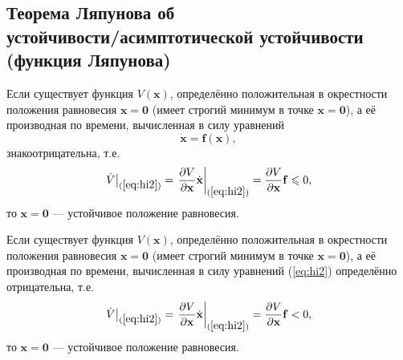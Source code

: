 \documentclass[a4paper]{article}
\begin{document}
\subsection{Теорема Ляпунова об\\
	устойчивости/асимптотической устойчивости\\
(функция Ляпунова)}
\begin{thm}
	Если существует функция $V(\mathbf{x})$, определённо положительная
	в окрестности положения равновесия $\mathbf{x}=\mathbf{0}$ (имеет
	строгий минимум в точке $\mathbf{x}=\mathbf{0}$), а её производная
	по времени, вычисленная в силу уравнений
	\[
				\dot{\mathbf{x}}=\mathbf{f}(\mathbf{x}) \tag{*}
				\label{eq:hi2}
			,\]
	знакоотрицательна, т.\:е.
\[
			\left. \dot{V}  \right|_{(\ref{eq:hi2})}=
			\left.\frac{\partial V}{\partial \mathbf{x}} \dot{\mathbf{x}}
			\right|_{(\ref{eq:hi2})}=\frac{\partial V}{\partial  \mathbf{x}}
			\mathbf{f}\le 0
		,\]
	то $\mathbf{x}=\mathbf{0}$ --- устойчивое положение равновесия.
\end{thm}
\begin{thm}
	Если существует функция $V(\mathbf{x})$, определённо положительная
	в окрестности положения равновесия $\mathbf{x}=\mathbf{0}$ (имеет
	строгий минимум в точке $\mathbf{x}=\mathbf{0}$), а её производная
	по времени, вычисленная в силу уравнений (\ref{eq:hi2})
	определённо отрицательна, т.\:е.
\[
			\left. \dot{V}  \right|_{(\ref{eq:hi2})}=
			\left.\frac{\partial V}{\partial \mathbf{x}} \dot{\mathbf{x}}
			\right|_{(\ref{eq:hi2})}=\frac{\partial V}{\partial  \mathbf{x}}
			\mathbf{f}< 0
		,\]
	то $\mathbf{x}=\mathbf{0}$ --- устойчивое положение равновесия.
\end{thm}
\end{document}
